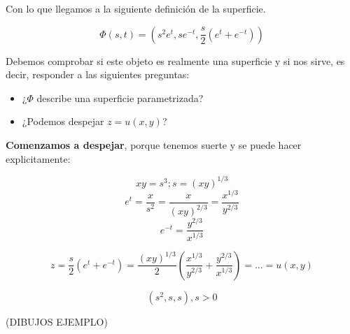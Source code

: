 \begin{example}{1}
		Con lo que llegamos a la siguiente definición de la superficie.

		$$ \Phi(s,t) = (s^2e^t, se^{-t}, \frac{s}{2}(e^t + e^{-t}))$$

		Debemos comprobar si este objeto es realmente una superficie y si nos sirve, es decir, responder a las siguientes preguntas:

		\begin{itemize}
			\item ¿$\Phi$ describe una superficie parametrizada?
			\item ¿Podemos despejar $z=u(x,y)$?
		\end{itemize}

		\textbf{Comenzamos a despejar}, porque tenemos suerte y se puede hacer explicitamente:

		$$xy = s^3; s=(xy)^{1/3}$$
		$$e^t = \frac{x}{s^2} = \frac{x}{(xy)^{2/3}} = \frac{x^{1/3}}{y^{2/3}}$$
		$$e^{-t} = \frac{y^{2/3}}{x^{1/3}}$$

		$$z = \frac{s}{2}(e^{t}+e^{-t}) = \frac{(xy)^{1/3}}{2} (\frac{x^{1/3}}{y^{2/3}}+\frac{y^{2/3}}{x^{1/3}}) = … = u(x,y) $$

		$$(s^2,s,s), s > 0$$

		(DIBUJOS EJEMPLO)

	\end{example}


